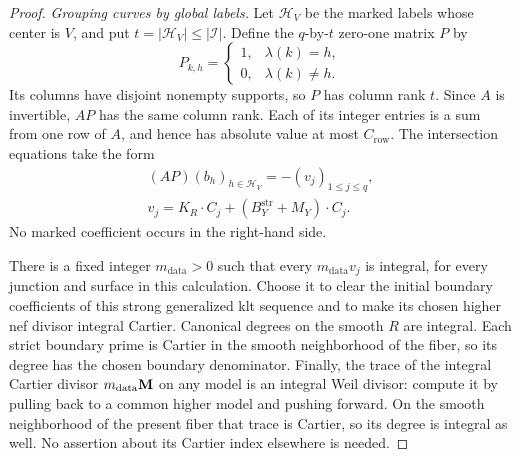 \begin{proof}
\medskip\noindent\emph{Grouping curves by global labels.}
Let $\mathcal H_V$ be the marked labels whose center is $V$, and put
$t=|\mathcal H_V|\leq|\mathcal I|$.  Define the $q$-by-$t$ zero-one
matrix $P$ by
\[
             P_{k,h}=\begin{cases}1,&\lambda(k)=h,\\0,&\lambda(k)\ne h.
                         \end{cases}
\]
Its columns have disjoint nonempty supports, so $P$ has column rank $t$.
Since $A$ is invertible, $AP$ has the same column rank.  Each of its
integer entries is a sum from one row of $A$, and hence has absolute
value at most $C_{\mathrm{row}}$.  The intersection equations take the
form
\begin{equation}\label{eq:grouped-surface-equations}
 \begin{gathered}
                  (AP)(b_h)_{h\in\mathcal H_V}=-(v_j)_{1\leq j\leq q},
 \\
 v_j=K_R\cdot C_j+(B_Y^{\mathrm{str}}+M_Y)\cdot C_j.
 \end{gathered}
\end{equation}
No marked coefficient occurs in the right-hand side.

There is a fixed integer $m_{\mathrm{data}}>0$ such that every
$m_{\mathrm{data}}v_j$ is integral, for every junction and surface in
this calculation.  Choose it to clear the initial boundary coefficients
of this strong generalized klt sequence and to make its chosen higher nef
divisor integral Cartier.  Canonical
degrees on the smooth $R$ are integral.  Each strict boundary prime is
Cartier in the smooth neighborhood of the fiber, so its degree has the
chosen boundary denominator.  Finally, the trace of the integral Cartier
divisor $m_{\mathrm{data}}\mathbf{M}$ on any model is an integral Weil divisor:
compute it by pulling back to a common higher model and pushing forward.
On the smooth neighborhood of the present fiber that trace is Cartier,
so its degree is integral as well.  No assertion about its Cartier index
elsewhere is needed.


\end{proof}
